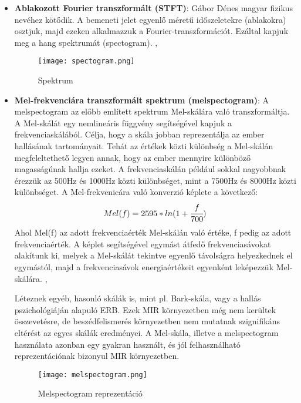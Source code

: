 \begin{itemize}
\item \textbf{Ablakozott Fourier transzformált (STFT)}: Gábor Dénes magyar fizikus nevéhez kötődik. A bemeneti jelet egyenlő méretű időszeletekre (ablakokra) osztjuk, majd ezeken alkalmazzuk a Fourier-transzformációt. Ezáltal kapjuk meg a hang spektrumát (spectogram).  \cite{melspec}, \cite{Choi2017}

\begin{figure}[H]
  \centering
  \texttt{[image: spectogram.png]}
  \caption{Spektrum \cite{librosa}}
\end{figure}

\item \textbf{Mel-frekvenciára transzformált spektrum (melspectogram)}: A melspectogram az előbb említett spektrum Mel-skálára való transzformáltja. A Mel-skálát egy nemlineáris függvény segítségével kapjuk a frekvenciaskálából. Célja, hogy a skála jobban reprezentálja az ember hallásának tartományait. Tehát az értékek közti különbség a Mel-skálán megfeleltethető legyen annak, hogy az ember mennyire különböző magasságúnak hallja ezeket. A frekvenciaskálán például sokkal nagyobbnak érezzük az 500Hz és 1000Hz közti különbséget, mint a 7500Hz és 8000Hz közti különbséget. A Mel-frekvenicára való konverzió képlete a következő: 
\begin{equation}
	Mel(f) = 2595*ln(1+\cfrac{f}{700})
\end{equation}
Ahol Mel(f) az adott frekvenciaérték Mel-skálán való értéke, f pedig az adott frekvenciaérték. A képlet segítségével egymást átfedő frekvenciasávokat alakítunk ki, melyek a Mel-skálát tekintve egyenlő távolságra helyezkednek el egymástól, majd a frekvenciasávok energiaértékeit egyenként leképezzük Mel-skálára. \cite{melspec}, \cite{Choi2017}
 
Léteznek egyéb, hasonló skálák is, mint pl. Bark-skála, vagy a hallás pszichológiáján alapuló ERB. Ezek MIR környezetben még nem kerültek összevetésre, de beszédfelismerés környezetben nem mutatnak szignifikáns eltérést az egyes skálák eredményei. A Mel-skála, illetve a melspectogram használata azonban egy gyakran használt, és jól felhasználható reprezentációnak bizonyul MIR környezetben. \cite{Choi2017}

\begin{figure}[H]
  \centering
  \texttt{[image: melspectogram.png]}
  \caption{Melspectogram reprezentáció \cite{librosa}}
\end{figure}


\end{itemize}
